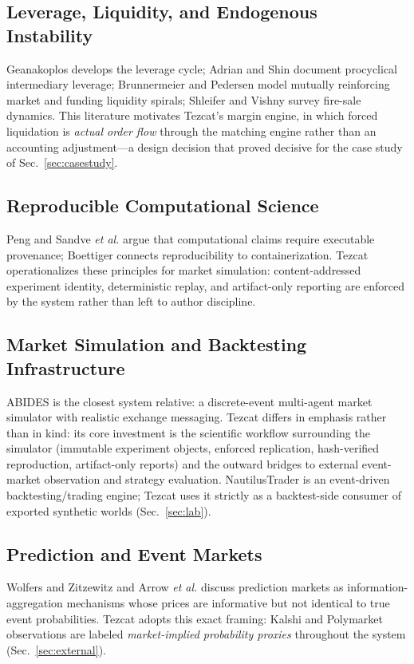 \documentclass[conference]{IEEEtran}
\newcommand{\tez}{Tezcat}
\begin{document}
\subsection{Leverage, Liquidity, and Endogenous Instability}
Geanakoplos \cite{geanakoplos2010} develops the leverage cycle; Adrian
and Shin \cite{adrian2010} document procyclical intermediary leverage;
Brunnermeier and Pedersen \cite{brunnermeier2009} model mutually
reinforcing market and funding liquidity spirals; Shleifer and Vishny
\cite{shleifer2011} survey fire-sale dynamics. This literature
motivates \tez{}'s margin engine, in which forced liquidation is
\emph{actual order flow} through the matching engine rather than an
accounting adjustment---a design decision that proved decisive for the
case study of Sec.~\ref{sec:casestudy}.

\subsection{Reproducible Computational Science}
Peng \cite{peng2011} and Sandve \emph{et al.} \cite{sandve2013} argue
that computational claims require executable provenance; Boettiger
\cite{boettiger2015} connects reproducibility to containerization.
\tez{} operationalizes these principles for market simulation:
content-addressed experiment identity, deterministic replay, and
artifact-only reporting are enforced by the system rather than left to
author discipline.

\subsection{Market Simulation and Backtesting Infrastructure}
ABIDES \cite{byrd2020} is the closest system relative: a discrete-event
multi-agent market simulator with realistic exchange messaging. \tez{}
differs in emphasis rather than in kind: its core investment is the
scientific workflow surrounding the simulator (immutable experiment
objects, enforced replication, hash-verified reproduction, artifact-only
reports) and the outward bridges to external event-market observation
and strategy evaluation. NautilusTrader \cite{nautilustrader} is an
event-driven backtesting/trading engine; \tez{} uses it strictly as a
backtest-side consumer of exported synthetic worlds
(Sec.~\ref{sec:lab}).

\subsection{Prediction and Event Markets}
Wolfers and Zitzewitz \cite{wolfers2004} and Arrow \emph{et al.}
\cite{arrow2008} discuss prediction markets as information-aggregation
mechanisms whose prices are informative but not identical to true event
probabilities. \tez{} adopts this exact framing: Kalshi
\cite{kalshiapi} and Polymarket \cite{polymarketapi} observations are
labeled \emph{market-implied probability proxies} throughout the system
(Sec.~\ref{sec:external}).
\end{document}
